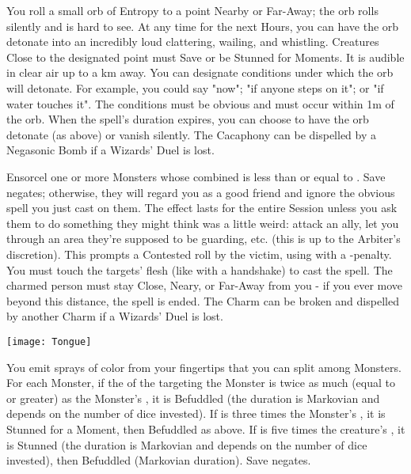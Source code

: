 {You roll a small orb of Entropy to a point Nearby or Far-Away; the orb rolls silently and is hard to see.  At any time for the next \SUMDICE Hours, you can have the orb detonate into an incredibly loud clattering, wailing, and
whistling. Creatures Close to the designated point must Save or be Stunned for \DICE Moments. It is audible in clear air up to a \DICE km away. You can designate \DICE conditions under which the orb will detonate. For example,
you could say "now"; "if anyone steps on it"; or "if water touches it".  The conditions must be obvious and must occur within 1m of the orb. When the spell's duration expires, you can choose to have the orb detonate (as above)
or vanish silently.  The Cacaphony can be dispelled by a Negasonic Bomb if a Wizards' Duel is lost.





\SPELL[
  Name=Charm,
  Link=wizardry-charm,
  Paradigm=Mind,
  Save=Y (negate),
  Duration=Session,
  Counter=\mylink{Charm}{wizardry-charm} ,
  Keywords=Contested,
  Target=Close Monster(s)
]



Ensorcel one or more Monsters whose combined \HD is less than or equal to \DICE.  Save negates; otherwise, they will regard you as a good friend and ignore the obvious spell you just cast on them.  The effect lasts for the
entire Session unless you ask them to do something they might think was a little weird: attack an ally, let you through an area they're supposed to be guarding, etc. (this is up to the Arbiter's discretion).  This prompts a
Contested roll by the victim, using \FOC with a -\DICE penalty.  You must touch the targets' flesh (like with a handshake) to cast the spell.  The charmed person must stay Close, Neary, or Far-Away from you - if you ever
move beyond this distance, the spell is ended.  The Charm can be broken and dispelled by another Charm if a Wizards' Duel is lost. 

  \begin{center}
  \texttt{[image: Tongue]}
  \end{center}


\SPELL[
  Name=Color Spray,
  Link=wizardry-color-spray,
  Paradigm=Mind,
  Save=Y (negate),
  Duration=0 / Markovian,
  Counter=None ,
  Keywords=Splittable,
  Target=Close or Nearby Monster(s)
]



You emit \DICE sprays of color from your fingertips that you can split among \DICE Monsters.  For each Monster, if the \SUMDICE of the \DICE targeting the Monster is twice as much (equal to or greater) as the Monster's \HD, it
is Befuddled (the duration is Markovian and depends on the number of dice invested).  If \SUMDICE is three times the Monster's \HD, it is Stunned for a Moment, then Befuddled as above. If \SUMDICE is five times the creature's
\HD, it is Stunned (the duration is Markovian and depends on the number of dice invested), then Befuddled (Markovian duration).  Save negates.





}
